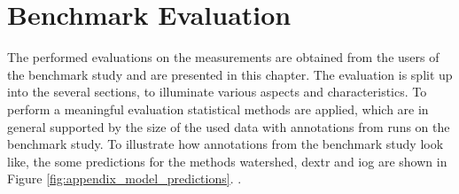 
\chapter{Benchmark Evaluation}\label{ord:ch5}

The performed evaluations on the measurements are obtained from the users of the benchmark study and are presented in this chapter.
The evaluation is split up into the several sections, to illuminate various aspects and characteristics.
To perform a meaningful evaluation statistical methods are applied, which are in general supported by the size of the used data with \getNumberBenchmarkAnnotations annotations from \getNumberBenchmarkRuns runs on the benchmark study.
To illustrate how annotations from the benchmark study look like, the some predictions for the methods watershed, \gls{dextr} and \gls{iog} are shown in Figure \ref{fig:appendix_model_predictions}.
.









